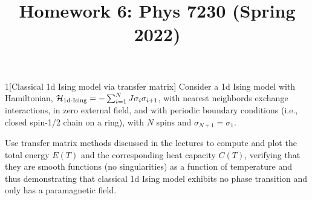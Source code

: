 \documentclass[12pt]{article}
\title{Homework 6: Phys 7230 (Spring 2022)}
\begin{document}
\maketitle
\begin{problem}{1}[Classical 1d Ising model via transfer matrix]
Consider a 1d Ising model with Hamiltonian, $\mathcal{H}_{\text{1d-Ising}}=-\sum_{i=1}^N
J\sigma_i\sigma_{i+1}$, with nearest neighbords exchange interactions, in zero
external field, and with periodic boundary conditions (i.e., closed spin-1/2
chain on a ring), with $N$ spins and $\sigma_{N+1}=\sigma_1$.

Use transfer matrix methods discussed in the lectures to compute and plot the
total energy $E(T)$ and the corresponding heat capacity $C(T)$, verifying that
they are smooth functions (no singularities) as a function of temperature and
thus demonstrating that classical 1d Ising model exhibits no phase transition
and only has a paramagnetic field.


\end{problem}
\end{document}
